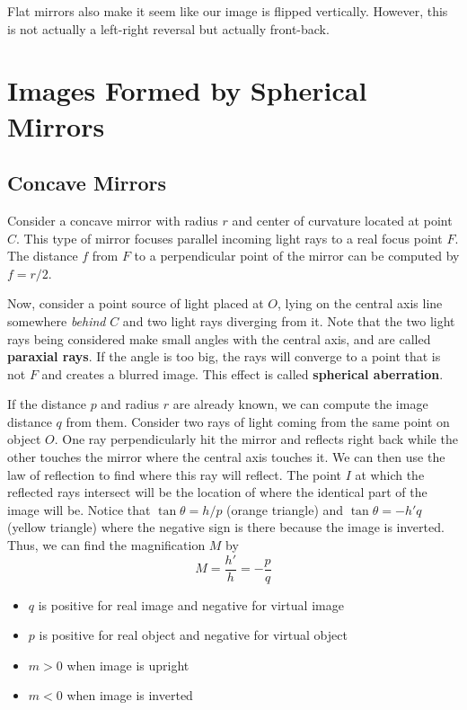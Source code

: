 Flat mirrors also make it seem like our image is flipped vertically. However, this is not actually
a left-right reversal but actually front-back.

\section{Images Formed by Spherical Mirrors}

\subsection{Concave Mirrors}


Consider a concave mirror with radius $r$ and center of curvature located at point $C$. This type
of mirror focuses parallel incoming light rays to a real focus point $F$. The distance $f$ from $F$ to
a perpendicular point of the mirror can be computed by $f = r/2$.

Now, consider a point source of light placed at $O$, lying on the central axis line somewhere
\textit{behind} $C$ and two light rays diverging from it. Note that the two light rays being considered
make small angles with the central axis, and are called \textbf{paraxial rays}. If the angle is too big,
the rays will converge to a point that is not $F$ and creates a blurred image. This effect is called 
\textbf{spherical aberration}.

If the distance $p$ and radius $r$ are already known, we can compute the image distance $q$ from them.
Consider two rays of light coming from the same point on object $O$. One ray perpendicularly hit the 
mirror and reflects right back while the other touches the mirror where the central axis touches it.
We can then use the law of reflection to find where this ray will reflect. The point $I$ at which 
the reflected rays intersect will be the location of where the identical part of the image will be.
Notice that $\tan\theta = h/p$ (orange triangle) and $\tan\theta = -h'q$ (yellow triangle) where the 
negative sign is there because the image is inverted. Thus, we can find the magnification $M$ by 
\begin{equation}\label{36.2}
    M = \frac{h'}{h} = - \frac{p}{q}
\end{equation}

\begin{itemize}
    \item $q$ is positive for real image and negative for virtual image 
    \item $p$ is positive for real object and negative for virtual object 
    \item $m>0$ when image is upright 
    \item $m<0$ when image is inverted
\end{itemize}

